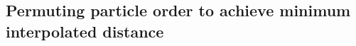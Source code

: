 




\subsection{Permuting particle order to achieve minimum interpolated distance}\label{app:SI_MPD}

